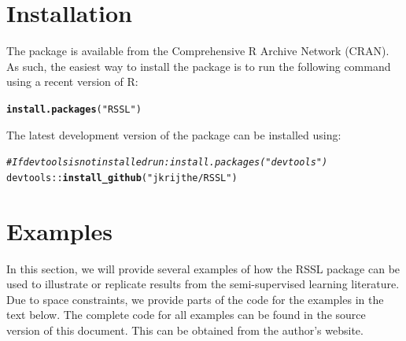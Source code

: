 \documentclass[runningheads,a4paper]{llncs}\usepackage[]{graphicx}\usepackage[]{color}
\makeatletter
\newcommand{\hlstr}[1]{\textcolor[rgb]{0.192,0.494,0.8}{#1}}%
\newcommand{\hlcom}[1]{\textcolor[rgb]{0.678,0.584,0.686}{\textit{#1}}}%
\newcommand{\hlopt}[1]{\textcolor[rgb]{0,0,0}{#1}}%
\newcommand{\hlstd}[1]{\textcolor[rgb]{0.345,0.345,0.345}{#1}}%
\newcommand{\hlkwd}[1]{\textcolor[rgb]{0.737,0.353,0.396}{\textbf{#1}}}%
\newenvironment{kframe}{%
 \def\at@end@of@kframe{}%
 \ifinner\ifhmode%
  \def\at@end@of@kframe{\end{minipage}}%
  \begin{minipage}{\columnwidth}%
 \fi\fi%
 \def\FrameCommand##1{\hskip\@totalleftmargin \hskip-\fboxsep
 \colorbox{shadecolor}{##1}\hskip-\fboxsep
     \hskip-\linewidth \hskip-\@totalleftmargin \hskip\columnwidth}%
 \MakeFramed {\advance\hsize-\width
   \@totalleftmargin\z@ \linewidth\hsize
   \@setminipage}}%
 {\par\unskip\endMakeFramed%
 \at@end@of@kframe}
\newenvironment{knitrout}{}{} %
\makeatother
\begin{document}
\section{Installation}
The package is available from the Comprehensive R Archive Network (CRAN). As such, the easiest way to install the package is to run the following command using a recent version of R:
\begin{knitrout}
\color{fgcolor}\begin{kframe}
\begin{alltt}
\hlkwd{install.packages}\hlstd{(}\hlstr{"RSSL"}\hlstd{)}
\end{alltt}
\end{kframe}
\end{knitrout}
\noindent The latest development version of the package can be installed using:
\begin{knitrout}
\color{fgcolor}\begin{kframe}
\begin{alltt}
\hlcom{# If devtools is not installed run: install.packages("devtools")}
\hlstd{devtools}\hlopt{::}\hlkwd{install_github}\hlstd{(}\hlstr{"jkrijthe/RSSL"}\hlstd{)}
\end{alltt}
\end{kframe}
\end{knitrout}

\section{Examples}
In this section, we will provide several examples of how the RSSL package can be used to illustrate or replicate results from the semi-supervised learning literature. Due to space constraints, we provide parts of the code for the examples in the text below. The complete code for all examples can be found in the source version of this document. This can be obtained from the author's website.
\end{document}
